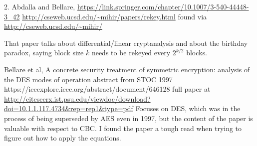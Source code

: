 2. Abdalla and Bellare,
\url{https://link.springer.com/chapter/10.1007/3-540-44448-3_42}
\url{http://cseweb.ucsd.edu/~mihir/papers/rekey.html}
found via
\url{http://cseweb.ucsd.edu/~mihir/}

That paper talks about differential/linear cryptanalysis and about the
birthday paradox, saying block size $k$ needs to be rekeyed every
$2^{k/2}$ blocks.

Bellare et al, A concrete security treatment of symmetric encryption:
analysis of the DES modes of operation
abstract from STOC 1997
https://ieeexplore.ieee.org/abstract/document/646128
full paper at
\url{http://citeseerx.ist.psu.edu/viewdoc/download?doi=10.1.1.117.4734&rep=rep1&type=pdf}
Focuses on DES, which was in the process of being superseded by AES
even in 1997, but the content of the paper is valuable with respect to
CBC.  I found the paper a tough read when trying to figure out how to
apply the equations.

